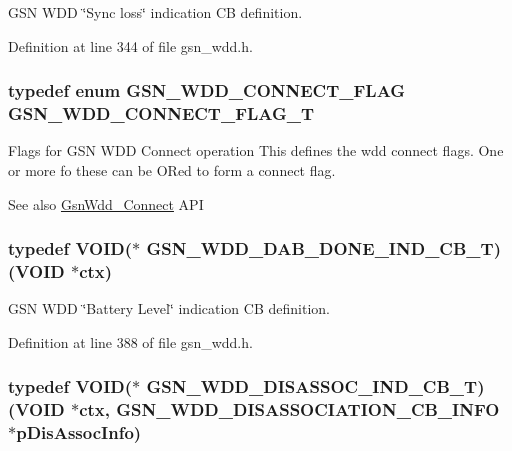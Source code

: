 GSN WDD \char`\"{}Sync loss\char`\"{} indication CB definition. 



Definition at line 344 of file gsn\_\-wdd.h.

\hypertarget{a00677_ga3a599f8d47bbbf9108f9156cddf9bd4b}{
\subsubsection[{GSN\_\-WDD\_\-CONNECT\_\-FLAG\_\-T}]{\setlength{\rightskip}{0pt plus 5cm}typedef enum {\bf GSN\_\-WDD\_\-CONNECT\_\-FLAG} {\bf GSN\_\-WDD\_\-CONNECT\_\-FLAG\_\-T}}}
\label{a00677_ga3a599f8d47bbbf9108f9156cddf9bd4b}


Flags for GSN WDD Connect operation This defines the wdd connect flags. One or more fo these can be ORed to form a connect flag. 

\begin{DoxySeeAlso}{See also}
\hyperlink{a00603_a03380e1642f9c5608bc3cf0b966991aa}{GsnWdd\_\-Connect} API 
\end{DoxySeeAlso}
\hypertarget{a00677_ga609ae39dc432b9821b764bea4957369a}{
\subsubsection[{GSN\_\-WDD\_\-DAB\_\-DONE\_\-IND\_\-CB\_\-T}]{\setlength{\rightskip}{0pt plus 5cm}typedef VOID($\ast$ {\bf GSN\_\-WDD\_\-DAB\_\-DONE\_\-IND\_\-CB\_\-T})(VOID $\ast$ctx)}}
\label{a00677_ga609ae39dc432b9821b764bea4957369a}


GSN WDD \char`\"{}Battery Level\char`\"{} indication CB definition. 



Definition at line 388 of file gsn\_\-wdd.h.

\hypertarget{a00677_gadb536a5e296beff888ffe8f4cdc68507}{
\subsubsection[{GSN\_\-WDD\_\-DISASSOC\_\-IND\_\-CB\_\-T}]{\setlength{\rightskip}{0pt plus 5cm}typedef VOID($\ast$ {\bf GSN\_\-WDD\_\-DISASSOC\_\-IND\_\-CB\_\-T})(VOID $\ast$ctx, {\bf GSN\_\-WDD\_\-DISASSOCIATION\_\-CB\_\-INFO} $\ast$pDisAssocInfo)}}
\label{a00677_gadb536a5e296beff888ffe8f4cdc68507}


